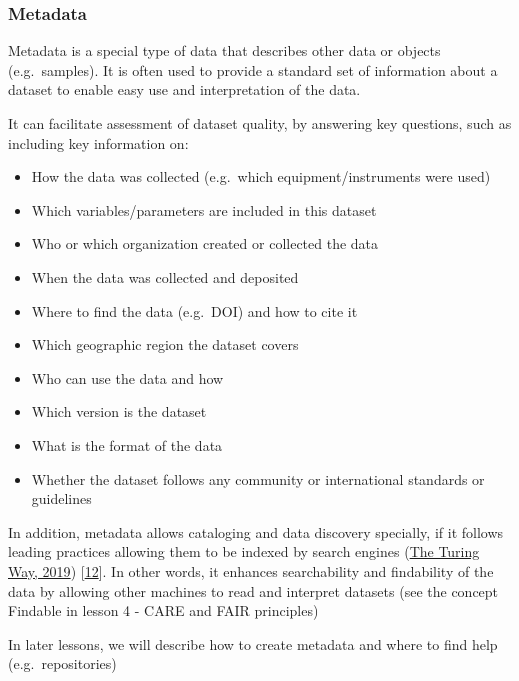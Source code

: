 \documentclass[
  letterpaper,
  DIV=11,
  numbers=noendperiod]{scrreport}
\providecommand{\tightlist}{%
  \setlength{\itemsep}{0pt}\setlength{\parskip}{0pt}}\usepackage{longtable,booktabs,array}
\begin{document}
\hypertarget{metadata}{%
\subsubsection*{Metadata}\label{metadata}}

Metadata is a special type of data that describes other data or objects
(e.g.~samples). It is often used to provide a standard set of
information about a dataset to enable easy use and interpretation of the
data.

It can facilitate assessment of dataset quality, by answering key
questions, such as including key information on:

\begin{itemize}
\tightlist
\item
  How the data was collected (e.g.~which equipment/instruments were
  used)
\item
  Which variables/parameters are included in this dataset
\item
  Who or which organization created or collected the data
\item
  When the data was collected and deposited
\item
  Where to find the data (e.g.~DOI) and how to cite it
\item
  Which geographic region the dataset covers
\item
  Who can use the data and how
\item
  Which version is the dataset
\item
  What is the format of the data
\item
  Whether the dataset follows any community or international standards
  or guidelines
\end{itemize}

In addition, metadata allows cataloging and data discovery specially, if
it follows leading practices allowing them to be indexed by search
engines
(\href{https://the-turing-way.netlify.app/reproducible-research/reproducible-research.html}{The
Turing Way, 2019})
{[}\href{https://the-turing-way.netlify.app/reproducible-research/reproducible-research.html}{12}{]}.
In other words, it enhances searchability and findability of the data by
allowing other machines to read and interpret datasets (see the concept
Findable in lesson 4 - CARE and FAIR principles)

In later lessons, we will describe how to create metadata and where to
find help (e.g.~repositories)
\end{document}
